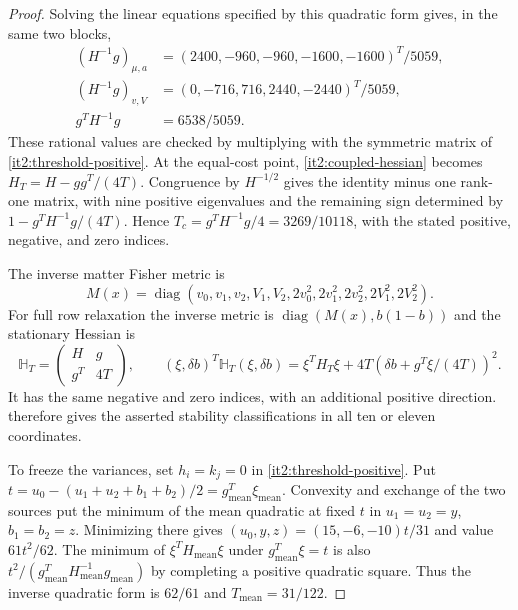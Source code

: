 \begin{proof}
Solving the linear equations specified by this quadratic form gives, in the same two blocks,
\begin{equation}
 \begin{aligned}
 (H^{-1}g)_{\mu,a}&=(2400,-960,-960,-1600,-1600)^T/5059,\\
 (H^{-1}g)_{v,V}&=(0,-716,716,2440,-2440)^T/5059,\\
 g^TH^{-1}g&=6538/5059.
 \end{aligned}
 \label{it2:threshold-inverse}
\end{equation}
These rational values are checked by multiplying with the symmetric matrix of \cref{it2:threshold-positive}. At the equal-cost point, \cref{it2:coupled-hessian} becomes $H_T=H-gg^T/(4T)$. Congruence by $H^{-1/2}$ gives the identity minus one rank-one matrix, with nine positive eigenvalues and the remaining sign determined by $1-g^TH^{-1}g/(4T)$. Hence $T_c=g^TH^{-1}g/4=3269/10118$, with the stated positive, negative, and zero indices.

The inverse matter Fisher metric is
\begin{equation}
 M(x)=\operatorname{diag}(v_0,v_1,v_2,V_1,V_2,
                         2v_0^2,2v_1^2,2v_2^2,2V_1^2,2V_2^2).
 \label{it2:threshold-mobility}
\end{equation}
For full row relaxation the inverse metric is $\operatorname{diag}(M(x),b(1-b))$ and the stationary Hessian is
\begin{equation}
 \mathbb H_T=\begin{pmatrix}H&g\\g^T&4T\end{pmatrix},\qquad
 (\xi,\delta b)^T\mathbb H_T(\xi,\delta b)
 =\xi^TH_T\xi+4T(\delta b+g^T\xi/(4T))^2 .
 \label{it2:threshold-full}
\end{equation}
It has the same negative and zero indices, with an additional positive direction.  therefore gives the asserted stability classifications in all ten or eleven coordinates.

To freeze the variances, set $h_i=k_j=0$ in \cref{it2:threshold-positive}. Put $t=u_0-(u_1+u_2+b_1+b_2)/2=g_{\mathrm{mean}}^T\xi_{\mathrm{mean}}$. Convexity and exchange of the two sources put the minimum of the mean quadratic at fixed $t$ in $u_1=u_2=y$, $b_1=b_2=z$. Minimizing there gives $(u_0,y,z)=(15,-6,-10)t/31$ and value $61t^2/62$. The minimum of $\xi^TH_{\mathrm{mean}}\xi$ under $g_{\mathrm{mean}}^T\xi=t$ is also $t^2/(g_{\mathrm{mean}}^TH_{\mathrm{mean}}^{-1}g_{\mathrm{mean}})$ by completing a positive quadratic square. Thus the inverse quadratic form is $62/61$ and $T_{\mathrm{mean}}=31/122$.
\end{proof}

